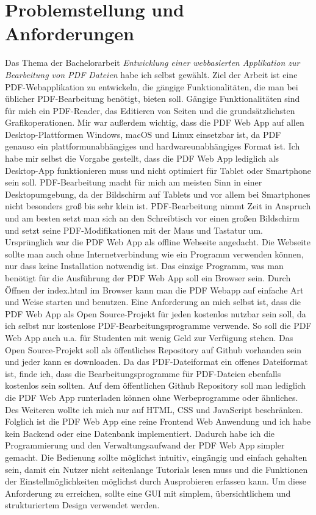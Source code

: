\section{Problemstellung und Anforderungen}
Das Thema der Bachelorarbeit \textit{\glqq Entwicklung einer webbasierten Applikation zur Bearbeitung von PDF Dateien\grqq} habe ich selbst gewählt. Ziel der Arbeit ist eine PDF-Webapplikation zu entwickeln, die gängige Funktionalitäten, die man bei üblicher PDF-Bearbeitung benötigt, bieten soll. Gängige Funktionalitäten sind für mich ein PDF-Reader, das Editieren von Seiten und die grundsätzlichsten Grafikoperationen. Mir war außerdem wichtig, dass die PDF Web App auf allen Desktop-Plattformen Windows, macOS und Linux einsetzbar ist, da PDF genauso ein plattformunabhängiges und hardwareunabhängiges Format ist. Ich habe mir selbst die Vorgabe gestellt, dass die PDF Web App lediglich als Desktop-App funktionieren muss und nicht optimiert für Tablet oder Smartphone sein soll. PDF-Bearbeitung macht für mich am meisten Sinn in einer Desktopumgebung, da der Bildschirm auf Tablets und vor allem bei Smartphones nicht besonders groß bis sehr klein ist. PDF-Bearbeitung nimmt Zeit in Anspruch und am besten setzt man sich an den Schreibtisch vor einen großen Bildschirm und setzt seine PDF-Modifikationen mit der Maus und Tastatur um. \\
Ursprünglich war die PDF Web App als offline Webseite angedacht. Die Webseite sollte man auch ohne Internetverbindung wie ein Programm verwenden können, nur dass keine Installation notwendig ist. Das einzige Programm, was man benötigt für die Ausführung der PDF Web App soll ein Browser sein. Durch Öffnen der index.html im Browser kann man die PDF Webapp auf einfache Art und Weise starten und benutzen. Eine Anforderung an mich selbst ist, dass die PDF Web App als Open Source-Projekt für jeden kostenlos nutzbar sein soll, da ich selbst nur kostenlose PDF-Bearbeitungsprogramme verwende. So soll die PDF Web App auch u.a. für Studenten mit wenig Geld zur Verfügung stehen. Das Open Source-Projekt soll als öffentliches Repository auf Github vorhanden sein und jeder kann es downloaden. Da das PDF-Dateiformat ein offenes Dateiformat ist, finde ich, dass die Bearbeitungsprogramme für PDF-Dateien ebenfalls kostenlos sein sollten. Auf dem öffentlichen Github Repository soll man lediglich die PDF Web App runterladen können ohne Werbeprogramme oder ähnliches. \\
Des Weiteren wollte ich mich nur auf HTML, CSS und JavaScript beschränken. Folglich ist die PDF Web App eine reine Frontend Web Anwendung und ich habe kein Backend oder eine Datenbank implementiert. Dadurch habe ich die Programmierung und den Verwaltungsaufwand der PDF Web App simpler gemacht. Die Bedienung sollte möglichst intuitiv, eingängig und einfach gehalten sein, damit ein Nutzer nicht seitenlange Tutorials lesen muss und die Funktionen der Einstellmöglichkeiten möglichst durch Ausprobieren erfassen kann. Um diese Anforderung zu erreichen, sollte eine GUI mit simplem, übersichtlichem und strukturiertem Design verwendet werden. \\
